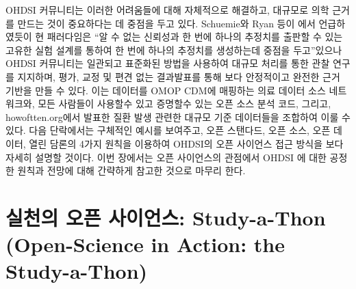 \documentclass[11pt]{book}
\theoremstyle{definition}
\theoremstyle{definition}
\theoremstyle{definition}
\theoremstyle{remark}
\begin{document}
OHDSI 커뮤니티는 이러한 어려움들에 대해 자체적으로 해결하고, 대규모로
의학 근거를 만드는 것이 중요하다는 데 중점을 두고 있다. Schuemie와 Ryan
등이 \citet{schuemie_2018b} 에서 언급하였듯이 현 패러다임은 ``알 수 없는
신뢰성과 한 번에 하나의 추정치를 출판할 수 있는 고유한 실험 설계를
통하여 한 번에 하나의 추정치를 생성하는데 중점을 두고''있으나 OHDSI
커뮤니티는 일관되고 표준화된 방법을 사용하여 대규모 처리를 통한 관찰
연구를 지지하며, 평가, 교정 및 편견 없는 결과발표를 통해 보다 안정적이고
완전한 근거 기반을 만들 수 있다. 이는 데이터를 OMOP CDM에 매핑하는 의료
데이터 소스 네트워크와, 모든 사람들이 사용할수 있고 증명할수 있는 오픈
소스 분석 코드, 그리고, howoftten.org에서 발표한 질환 발생 관련한 대규모
기준 데이터들을 조합하여 이룰 수 있다. 다음 단락에서는 구체적인 예시를
보여주고, 오픈 스탠다드, 오픈 소스, 오픈 데이터, 열린 담론의 4가지
원칙을 이용하여 OHDSI의 오픈 사이언스 접근 방식을 보다 자세히 설명할
것이다. 이번 장에서는 오픈 사이언스의 관점에서 OHDSI 에 대한 공정한
원칙과 전망에 대해 간략하게 참고한 것으로 마무리 한다.

\section{실천의 오픈 사이언스: Study-a-Thon (Open-Science in Action: the
Study-a-Thon)}\label{---study-a-thon-open-science-in-action-the-study-a-thon}

\end{document}
